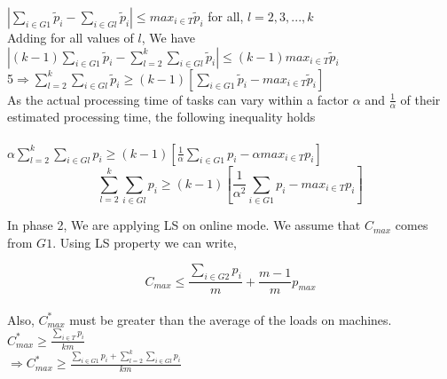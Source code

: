 \documentclass[10pt, conference, compsocconf]{IEEEtran}
\begin{document}
$|\sum_{i \in G1 }^{}{\tilde p_{i}}- \sum_{i \in Gl }^{}{\tilde p_{i}}| \leq {max_{i \in T}}{\tilde p_{i}}$  \hspace*{15pt}   for all, $l = 2,3,...,k$ \\

Adding for all values of $l$, We have \\

$|(k-1)\sum_{i \in G1 }^{}{\tilde p_{i}}- \sum_{l=2}^{k}\sum_{i \in Gl }^{}{\tilde p_{i}}| \leq (k-1) {max_{i \in T}}{\tilde p_{i}}$  \hspace*{15pt}   \\

5$\Rightarrow \sum_{l=2}^{k}\sum_{i \in Gl }^{}{\tilde p_{i}} \geq (k-1)[\sum_{i \in G1 }^{}{\tilde p_{i}}- {max_{i \in T}}{\tilde p_{i}}]$\\



As the actual processing time of tasks  can vary within a factor $\alpha$ and $\frac{1}{\alpha}$ of their estimated processing time, the following inequality holds\\
\\
\hspace*{90pt}$ \alpha\sum_{l=2}^{k}\sum_{i \in Gl }^{}{{p_{i}}} \geq (k-1)[\frac{1}{\alpha}\sum_{i \in G1 }^{}{{p_{i}}}- \alpha {max_{i \in T}}{{p_{i}}}]$\\
\begin{equation}
\sum_{l=2}^{k}\sum_{i \in Gl }^{}{{p_{i}}} \geq (k-1)[\frac{1}{\alpha^{2}}\sum_{i \in G1 }^{}{{p_{i}}}-  {max_{i \in T}}{{p_{i}}}]
\end{equation}

In phase 2, We are applying LS on online mode. We assume that $C_{max}$ comes from $G1$. Using LS property we can write,

\begin{equation}
 C_{max} \leq \frac{\sum_{i \in G2 }^{}{{p_{i}}}}{m} + {\frac{m-1}{m}} p_{max} 
\end{equation}
\\

Also, $C_{max}^{*}$ must be greater than the average of the  loads on  machines.\\

\hspace*{90pt}$C_{max}^{*} \geq  \frac{\sum_{i \in T }^{}{{p_{i}}}}{km}$\\

\hspace*{90pt}$\Rightarrow C_{max}^{*} \geq  \frac{\sum_{i \in G1 }^{}{{p_{i}}}+ \sum_{l=2}^{k}\sum_{i \in Gl }^{}{{p_{i}}}}{km}$\\
\end{document}

